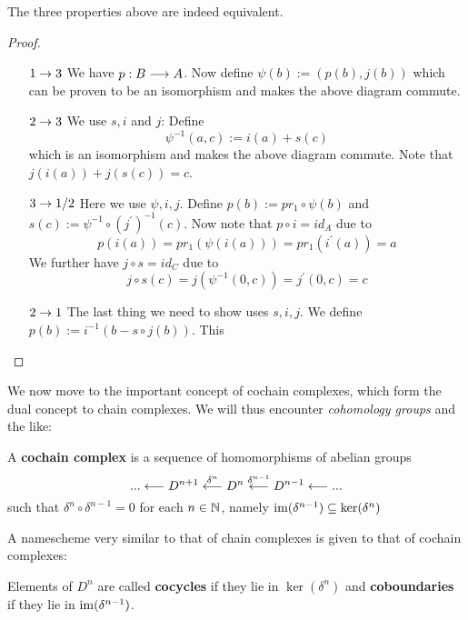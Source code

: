 \begin{lem}
  The three properties above are indeed equivalent.

\begin{proof}~
\begin{itemize}
  \item[$1\rightarrow 3$]  We have $p:B \longrightarrow A$. Now define $\psi(b):= (p(b),j(b))$ which can be proven to be an isomorphism and makes the above diagram commute.

  \item[$2\rightarrow 3$] We use $s,i$ and $j$: Define
  $$ \psi^{-1}(a,c) := i(a)+s(c) $$
  which is an isomorphism and makes the above diagram commute. Note that $j(i(a)) + j(s(c)) = c$.

  \item[$3\rightarrow 1/2$] Here we use $\psi,i,j$. Define $p(b):= pr_1 \circ \psi(b)$ and $s(c):= \psi^{-1} \circ (j^\prime)^{-1}(c)$. Now note that $p \circ i = id_A$ due to
  $$ p(i(a)) = pr_1(\psi(i(a))) = pr_1(i^\prime(a)) = a $$
  We further have $j \circ s = id_C$ due to
  $$ j \circ s(c) = j(\psi^{-1}(0,c)) = j^\prime(0,c) = c $$

  \item[$2\rightarrow 1$] The last thing we need to show uses $s,i,j$. We define $p(b) := i^{-1}(b - s \circ j(b))$. This
\end{itemize}
\end{proof}
\end{lem}

We now move to the important concept of cochain complexes, which form the dual concept to chain complexes. We will thus encounter \emph{cohomology groups} and the like:

\begin{definition}
  A \textbf{cochain complex} is a sequence of homomorphisms of abelian groups
  $$ ... \longleftarrow D^{n+1} \overset{\delta^n}{\longleftarrow} D^n \overset{\delta^{n-1}}{\longleftarrow} D^{n-1} \longleftarrow ... $$
  such that $\delta^n \circ \delta^{n-1} = 0$ for each $n\in \mathbb{N}$, namely $\operatorname{im} (\delta^{n-1}) \subseteq \ker (\delta^n)$
\end{definition}

A namescheme very similar to that of chain complexes is given to that of cochain complexes:

\begin{definition}
  Elements of $D^n$ are called \textbf{cocycles} if they lie in $\ker(\delta^n)$ and \textbf{coboundaries} if they lie in $\operatorname{im}(\delta^{n-1})$.
\end{definition}

